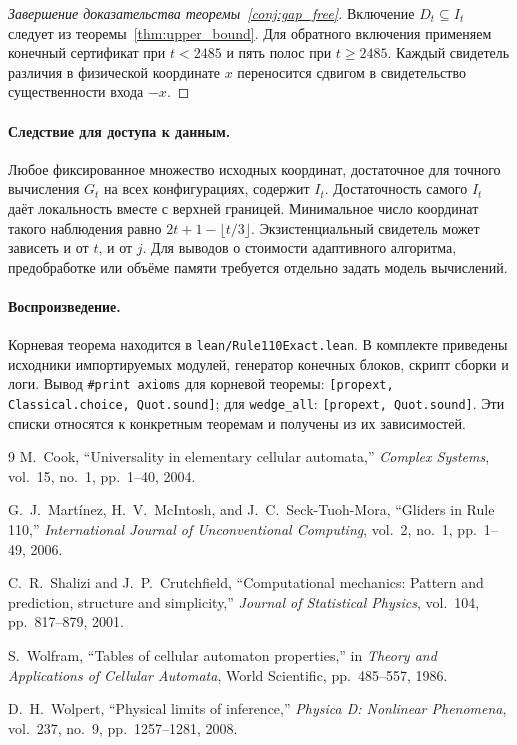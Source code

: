 \documentclass[11pt, a4paper]{article}
\begin{document}
\begin{proof}[Завершение доказательства теоремы~\ref{conj:gap_free}]
Включение $D_t\subseteq I_t$ следует из теоремы~\ref{thm:upper_bound}. Для обратного включения применяем конечный сертификат при $t<2485$ и пять полос при $t\ge2485$. Каждый свидетель различия в физической координате $x$ переносится сдвигом в свидетельство существенности входа $-x$.
\end{proof}

\paragraph{Следствие для доступа к данным.}
Любое фиксированное множество исходных координат, достаточное для точного вычисления $G_t$ на всех конфигурациях, содержит $I_t$. Достаточность самого $I_t$ даёт локальность вместе с верхней границей. Минимальное число координат такого наблюдения равно $2t+1-\lfloor t/3\rfloor$. Экзистенциальный свидетель может зависеть и от $t$, и от $j$. Для выводов о стоимости адаптивного алгоритма, предобработке или объёме памяти требуется отдельно задать модель вычислений.

\paragraph{Воспроизведение.}
Корневая теорема находится в \texttt{lean/Rule110Exact.lean}. В комплекте приведены исходники импортируемых модулей, генератор конечных блоков, скрипт сборки и логи. Вывод \texttt{\#print axioms} для корневой теоремы: \texttt{[propext, Classical.choice, Quot.sound]}; для \texttt{wedge\_all}: \texttt{[propext, Quot.sound]}. Эти списки относятся к конкретным теоремам и получены из их зависимостей.

\begin{thebibliography}{9}
M.~Cook, ``Universality in elementary cellular automata,'' \emph{Complex Systems}, vol.~15, no.~1, pp.~1--40, 2004.

G.~J.~Mart\'inez, H.~V.~McIntosh, and J.~C.~Seck-Tuoh-Mora, ``Gliders in Rule 110,'' \emph{International Journal of Unconventional Computing}, vol.~2, no.~1, pp.~1--49, 2006.

C.~R.~Shalizi and J.~P.~Crutchfield, ``Computational mechanics: Pattern and prediction, structure and simplicity,'' \emph{Journal of Statistical Physics}, vol.~104, pp.~817--879, 2001.

S.~Wolfram, ``Tables of cellular automaton properties,'' in \emph{Theory and Applications of Cellular Automata}, World Scientific, pp.~485--557, 1986.

D.~H.~Wolpert, ``Physical limits of inference,'' \emph{Physica D: Nonlinear Phenomena}, vol.~237, no.~9, pp.~1257--1281, 2008.
\end{thebibliography}
\end{document}
